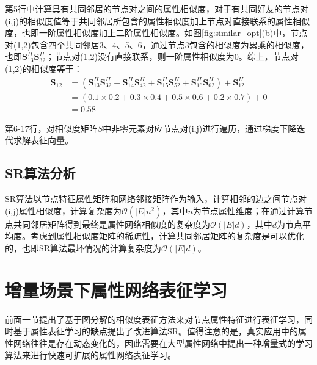 第5行中计算具有共同邻居的节点对之间的属性相似度，对于有共同好友的节点对(i,j)的相似度值等于共同邻居所包含的属性相似度加上节点对直接联系的属性相似度，也即一阶属性相似度加上二阶属性相似度。如图\ref{fig:similar_opt}(b)中，节点对(1,2)包含四个共同邻居3、4、5、6，通过节点3包含的相似度为累乘的相似度，也即$\textbf{S}^H_{13}\textbf{S}^H_{32}$；节点对(1,2)没有直接联系，则一阶属性相似度为0。综上，节点对(1,2)的相似度等于：
\begin{equation}
\begin{aligned}
\textbf{S}_{12} &= (\textbf{S}^H_{13}\textbf{S}^H_{32}+ \textbf{S}^H_{14}\textbf{S}^H_{42}+ \textbf{S}^H_{15}\textbf{S}^H_{52}+\textbf{S}^H_{16}\textbf{S}^H_{62})+ \textbf{S}^H_{12} \\
 &=(0.1\times 0.2 + 0.3\times 0.4 +0.5\times 0.6 +0.2\times 0.7) + 0 \\
 &= 0.58
\end{aligned} 
\end{equation}

第6-17行，对相似度矩阵$S$中非零元素对应节点对(i,j)进行遍历，通过梯度下降迭代求解表征向量。
\subsection{SR算法分析}
SR算法以节点特征属性矩阵和网络邻接矩阵作为输入，计算相邻的边之间节点对(i,j)属性相似度，计算复杂度为$\mathcal{O}(|E|n^2)$，其中$n$为节点属性维度；在通过计算节点共同邻居矩阵得到最终是属性网络相似度的复杂度为$\mathcal{O}(|E|d)$，其中$d$为节点平均度。考虑到属性相似度矩阵的稀疏性，计算共同邻居矩阵的复杂度是可以优化的，也即SR算法最坏情况的计算复杂度为$\mathcal{O}(|E|d)$。

\section{增量场景下属性网络表征学习}
前面一节提出了基于图分解的相似度表征方法来对节点属性特征进行表征学习，同时基于属性表征学习的缺点提出了改进算法SR。值得注意的是，真实应用中的属性网络往往是存在动态变化的，因此需要在大型属性网络中提出一种增量式的学习算法来进行快速可扩展的属性网络表征学习。  

